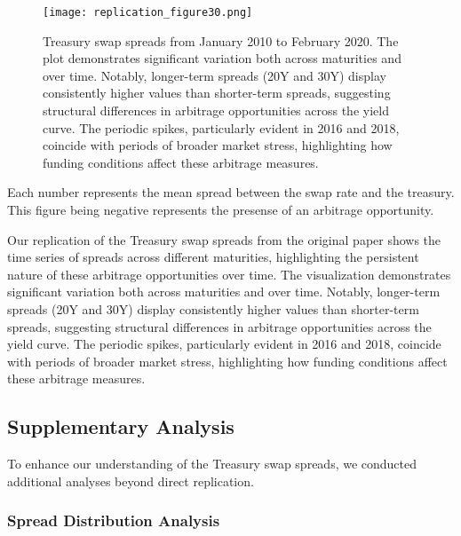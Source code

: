 \documentclass[12pt]{article}
\begin{document}
\begin{figure}[H]
    \centering
    \texttt{[image: replication\_figure30.png]}
    \caption{Treasury swap spreads from January 2010 to February 2020. The plot demonstrates significant variation both across maturities and over time. Notably, longer-term spreads (20Y and 30Y) display consistently higher values than shorter-term spreads, suggesting structural differences in arbitrage opportunities across the yield curve. The periodic spikes, particularly evident in 2016 and 2018, coincide with periods of broader market stress, highlighting how funding conditions affect these arbitrage measures.}
    \label{fig:treasury_swap_spreads_supplementary30}
\end{figure}

\begin{table}
\centering

\caption{Each number represents the mean spread between the swap rate and the treasury. This figure being negative represents the presense of an arbitrage opportunity.}
\end{table}

Our replication of the Treasury swap spreads from the original paper shows the time series of spreads across different maturities, highlighting the persistent nature of these arbitrage opportunities over time. The visualization demonstrates significant variation both across maturities and over time. Notably, longer-term spreads (20Y and 30Y) display consistently higher values than shorter-term spreads, suggesting structural differences in arbitrage opportunities across the yield curve. The periodic spikes, particularly evident in 2016 and 2018, coincide with periods of broader market stress, highlighting how funding conditions affect these arbitrage measures.

\subsection{Supplementary Analysis}

To enhance our understanding of the Treasury swap spreads, we conducted additional analyses beyond direct replication.

\subsubsection{Spread Distribution Analysis}

\end{document}
